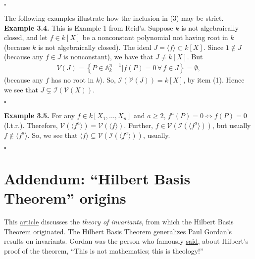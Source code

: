 \documentclass[12pt]{article}
\newcommand{\lc}{\left\{}
\newcommand{\rc}{\right\}}
\begin{document}
\hfill $\square$

\noindent The following examples illustrate how the inclusion in (3) may be strict.\\



\noindent \textbf{Example 3.4.} This is Example 1 from Reid's. Suppose $k$ is not algebraically closed, and let $f\in k[X]$ be a nonconstant polynomial not having root in $k$ (because $k$ is not algebraically closed). The ideal $J = \langle f \rangle \subset k[X]$. Since $1\notin J$ (because any $f\in J$ is nonconstant), we have that $J \neq k[X]$. But
\begin{align*}
V(J) = \lc P \in \mathbb{A}^{n=1}_k \vert f(P) = 0 \, \forall \, f\in J \rc = \emptyset,
\end{align*}
(because any $f$ has no root in $k$). So, $\mathcal{I}(\mathcal{V}(J)) = k[X]$, by item (1). Hence we see that $J \subsetneq \mathcal{I}(\mathcal{V}(X))$. 
 
 
 
 
 
 
\hfill $\square$



\noindent \textbf{Example 3.5.} For any $f \in k[X_1,\dots,X_n]$ and $a\geq 2$, $f^a(P) = 0 \iff f(P) = 0$ (l.t.r.). Therefore, $\mathcal{V}(\langle f^a\rangle) = \mathcal{V}(\langle f \rangle)$. Further, $f\in \mathcal{V}(\mathcal{I}(\langle f^a \rangle ))$, but usually $f \notin \langle f^a\rangle $. So, we see that $\langle f \rangle \subsetneq \mathcal{V}(\mathcal{I}(\langle f^a \rangle ))$, usually.   	  


\hfill $\square$







\newpage


\section{Addendum: ``Hilbert Basis Theorem'' origins}



This  \href{https://www.encyclopediaofmath.org/index.php/Invariants,_theory_of}{\underline{article}} discusses the \textit{theory of invariants}, from which the Hilbert Basis Theorem originated. The Hilbert Basis Theorem generalizes Paul Gordan's results on invariants. Gordan was the person who famously \href{https://wayback.archive-it.org/all/20090116011956/http://people.math.jussieu.fr/~harris/theology.pdf}{\underline{said}}, about Hilbert's proof of the theorem, ``This is not mathematics; this is theology!''  















	
\end{document}
